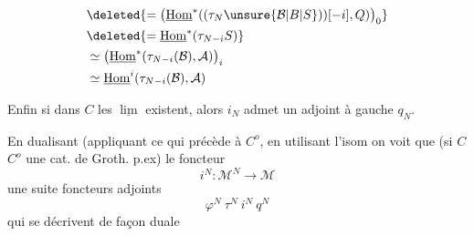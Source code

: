 \[
\begin{aligned}
&\deleted{=\bigl(\underline{\mathrm{Hom}}^{*}((\tau_N\unsure{\mathcal{B}|B|S}))[-i],Q)\bigr)_0}\\
&\deleted{=\underline{\mathrm{Hom}}^{*}(\tau_{N-i}S)}\\
&\simeq\bigl(\underline{\mathrm{Hom}}^{*}(\tau_{N-i}(\mathcal{B}),\mathcal{A})\bigr)_i\\
&\simeq\underline{\mathrm{Hom}}^{i}(\tau_{N-i}(\mathcal{B}),\mathcal{A})
\end{aligned}
\]

Enfin si dans $C$ les $\underline{\lim}$ existent, alors $i_N$ admet un adjoint à gauche $q_N$.

En dualisant (appliquant ce qui précède à $C^o$, en utilisant l'isom
on voit que (si $C$  $C^o$  une cat. de Groth. p.ex) le foncteur
\[
i^N:\mathcal{M}^N\longrightarrow\mathcal{M}
\]
  une suite   foncteurs adjoints
\[
\varphi^{N}\ \tau^{N}\ i^{N}\ q^{N}
\]
qui se décrivent de façon duale 

